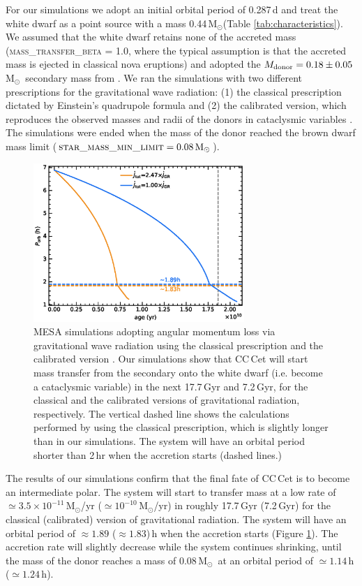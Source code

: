 \documentclass[fleqn,usenatbib]{mnras}
\newcommand{\Msun}{\mbox{$\mathrm{M}_{\odot}$}}
\begin{document}
For our simulations we adopt an initial orbital period of 0.287\,d and treat the white dwarf as a point source with a mass 0.44\,\Msun (Table \ref{tab:characteristics}). We assumed that the white dwarf retains none of the accreted mass (\textsc{mass\_transfer\_beta} = 1.0, where the typical assumption is that the accreted mass is ejected in classical nova eruptions) and adopted the $M_{\rm donor}=0.18\pm0.05$\,\Msun\ secondary mass from \citet{safferetal93-1}. We ran the simulations with two different prescriptions for the gravitational wave radiation: (1) the classical prescription dictated by Einstein's quadrupole formula \citep{paczynski67-1} and (2) the calibrated version, which reproduces the observed masses and radii of the donors in cataclysmic variables \citep{kniggeetal11-1}. The simulations were ended when the mass of the donor reached the brown dwarf mass limit ($\mbox{\textsc{star\_mass\_min\_limit}}=0.08\,\Msun$).

\begin{figure}
    \centering
    \includegraphics[width=8cm]{Porb_age_v2.eps}
    \caption{MESA simulations adopting angular momentum loss via gravitational wave radiation using the classical prescription \citep[][blue]{paczynski67-1} and the calibrated version \citep[][ orange]{kniggeetal11-1}. Our simulations show that CC\,Cet will start mass transfer from the secondary onto the white dwarf (i.e. become a cataclysmic variable) in the next 17.7\,Gyr and 7.2\,Gyr, for the classical and the calibrated versions of gravitational radiation, respectively. The vertical dashed line shows the calculations performed by \citet{schreiber+gaensicke03-1} using the classical prescription, which is slightly longer than in our simulations. The system will have an orbital period shorter than 2\,hr when the accretion starts (dashed lines.) }
    \label{fig:MESA}
\end{figure}

The results of our simulations confirm that the final fate of CC\,Cet is to become an intermediate polar. The system will start to transfer mass at a low rate of $\simeq 3.5\times10^{-11}$\,\Msun/yr ($\simeq 10^{-10}$\,\Msun/yr) in roughly 17.7\,Gyr (7.2\,Gyr) for the classical (calibrated) version of gravitational radiation. The system will have an orbital period of $\approx 1.89$ ($\approx 1.83$)\,h when the accretion starts (Figure \ref{fig:MESA}). The accretion rate will slightly decrease while the system continues shrinking, until the mass of the donor reaches a mass of 0.08\,\Msun\ at an orbital period of $\simeq1.14$\,h ($\simeq1.24$\,h). 
\end{document}
